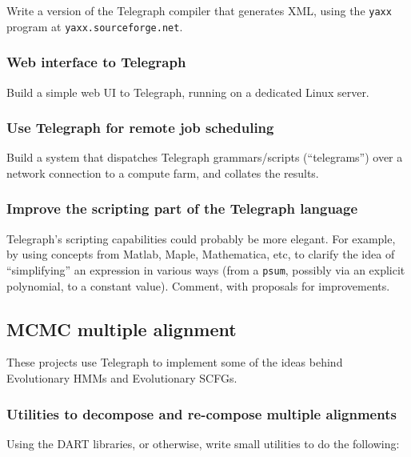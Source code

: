 \documentclass{article}
\begin{document}
Write a version of the Telegraph compiler that generates XML,
using the {\tt yaxx} program at {\tt yaxx.sourceforge.net}.

\subsubsection{Web interface to Telegraph}

Build a simple web UI to Telegraph, running on a dedicated Linux server.

\subsubsection{Use Telegraph for remote job scheduling}

Build a system that dispatches Telegraph grammars/scripts (``telegrams'')
over a network connection to a compute farm, and collates the results.

\subsubsection{Improve the scripting part of the Telegraph language}

Telegraph's scripting capabilities could probably be more elegant.
For example, by using concepts from Matlab, Maple, Mathematica, etc,
to clarify the idea of ``simplifying'' an expression in various ways
(from a {\tt psum}, possibly via an explicit polynomial, to a constant value).
Comment, with proposals for improvements.

\subsection{MCMC multiple alignment}

These projects use Telegraph to implement some of the ideas behind
Evolutionary HMMs and Evolutionary SCFGs.

\subsubsection{Utilities to decompose and re-compose multiple alignments}

Using the DART libraries, or otherwise,
write small utilities to do the following:
\end{document}
